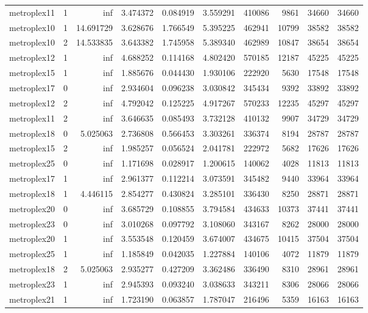\begin{longtable}{|l|r|r|r|r|r|r|r|r|r|}
metroplex11 & 1 & inf & 3.474372 & 0.084919 & 3.559291 & 410086 & 9861 & 34660 & 34660 \\
metroplex10 & 1 & 14.691729 & 3.628676 & 1.766549 & 5.395225 & 462941 & 10799 & 38582 & 38582 \\
metroplex10 & 2 & 14.533835 & 3.643382 & 1.745958 & 5.389340 & 462989 & 10847 & 38654 & 38654 \\
metroplex12 & 1 & inf & 4.688252 & 0.114168 & 4.802420 & 570185 & 12187 & 45225 & 45225 \\
metroplex15 & 1 & inf & 1.885676 & 0.044430 & 1.930106 & 222920 & 5630 & 17548 & 17548 \\
metroplex17 & 0 & inf & 2.934604 & 0.096238 & 3.030842 & 345434 & 9392 & 33892 & 33892 \\
metroplex12 & 2 & inf & 4.792042 & 0.125225 & 4.917267 & 570233 & 12235 & 45297 & 45297 \\
metroplex11 & 2 & inf & 3.646635 & 0.085493 & 3.732128 & 410132 & 9907 & 34729 & 34729 \\
metroplex18 & 0 & 5.025063 & 2.736808 & 0.566453 & 3.303261 & 336374 & 8194 & 28787 & 28787 \\
metroplex15 & 2 & inf & 1.985257 & 0.056524 & 2.041781 & 222972 & 5682 & 17626 & 17626 \\
metroplex25 & 0 & inf & 1.171698 & 0.028917 & 1.200615 & 140062 & 4028 & 11813 & 11813 \\
metroplex17 & 1 & inf & 2.961377 & 0.112214 & 3.073591 & 345482 & 9440 & 33964 & 33964 \\
metroplex18 & 1 & 4.446115 & 2.854277 & 0.430824 & 3.285101 & 336430 & 8250 & 28871 & 28871 \\
metroplex20 & 0 & inf & 3.685729 & 0.108855 & 3.794584 & 434633 & 10373 & 37441 & 37441 \\
metroplex23 & 0 & inf & 3.010268 & 0.097792 & 3.108060 & 343167 & 8262 & 28000 & 28000 \\
metroplex20 & 1 & inf & 3.553548 & 0.120459 & 3.674007 & 434675 & 10415 & 37504 & 37504 \\
metroplex25 & 1 & inf & 1.185849 & 0.042035 & 1.227884 & 140106 & 4072 & 11879 & 11879 \\
metroplex18 & 2 & 5.025063 & 2.935277 & 0.427209 & 3.362486 & 336490 & 8310 & 28961 & 28961 \\
metroplex23 & 1 & inf & 2.945393 & 0.093240 & 3.038633 & 343211 & 8306 & 28066 & 28066 \\
metroplex21 & 1 & inf & 1.723190 & 0.063857 & 1.787047 & 216496 & 5359 & 16163 & 16163 \\

\end{longtable}
